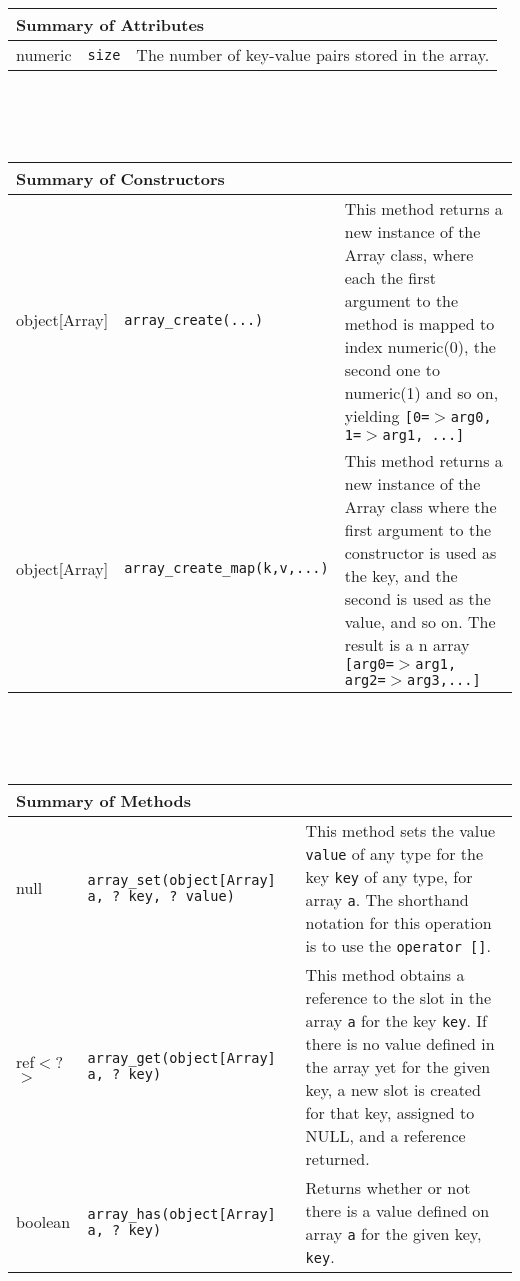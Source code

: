\begin{tabular}{|p{1.0in}|p{2.0in}||p{3in}|}
  \hline
  \multicolumn{3}{|l|}{\textbf{Summary of Attributes}}\\
  \hline
  numeric & {\tt size} & The number of key-value pairs stored in the array.\\
  \hline
\end{tabular}\\
\\\ \\
\begin{tabular}{|p{1.0in}|p{2.0in}||p{3in}|}
  \hline
  \multicolumn{3}{|l|}{\textbf{Summary of Constructors}}\\
  \hline
  object[Array] & {\tt array\_create(...)} & This method returns a new instance of the Array class,
  where each the first argument to the method is mapped to index numeric(0), the second one to
  numeric(1) and so on, yielding {\tt [0=$>$arg0, 1=$>$arg1, ...]}\\
  object[Array] & {\tt array\_create\_map(k,v,...)} & This method returns a new instance of the Array
  class where the first argument to the constructor is used as the key, and the second is used
  as the value, and so on. The result is a n array {\tt [arg0=$>$arg1, arg2=$>$arg3,...] }\\
  \hline
\end{tabular}  \\
\\\ \\
\begin{tabular}{|p{1.0in}|p{2.0in}||p{3in}|}
  \hline
  \multicolumn{3}{|l|}{\textbf{Summary of Methods}}\\
  \hline
  null & {\tt array\_set(object[Array] a, ? key, ? value)} & This method sets the value {\tt value} of any
  type for the key {\tt key} of any type, for array {\tt a}. The shorthand notation for this operation
  is to use the {\tt operator []}.\\
  ref$<$?$>$ & {\tt array\_get(object[Array] a, ? key) } & This method obtains a reference to the slot in the
  array {\tt a} for the key {\tt key}. If there is no value defined in the array yet for the given key,
  a new slot is created for that key, assigned to NULL, and a reference returned.\\
  boolean & {\tt array\_has(object[Array] a, ? key)} & Returns whether or not there is a value defined
  on array {\tt a} for the given key, {\tt key}.\\
  \hline
\end{tabular}

